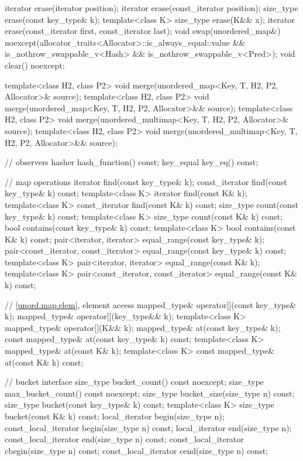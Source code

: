 \begin{codeblock}
{{    iterator  erase(iterator position);
    iterator  erase(const_iterator position);
    size_type erase(const key_type& k);
    template<class K> size_type erase(K&& x);
    iterator  erase(const_iterator first, const_iterator last);
    void      swap(unordered_map&)
      noexcept(allocator_traits<Allocator>::is_always_equal::value &&
               is_nothrow_swappable_v<Hash> &&
               is_nothrow_swappable_v<Pred>);
    void      clear() noexcept;

    template<class H2, class P2>
      void merge(unordered_map<Key, T, H2, P2, Allocator>& source);
    template<class H2, class P2>
      void merge(unordered_map<Key, T, H2, P2, Allocator>&& source);
    template<class H2, class P2>
      void merge(unordered_multimap<Key, T, H2, P2, Allocator>& source);
    template<class H2, class P2>
      void merge(unordered_multimap<Key, T, H2, P2, Allocator>&& source);

    // observers
    hasher hash_function() const;
    key_equal key_eq() const;

    // map operations
    iterator         find(const key_type& k);
    const_iterator   find(const key_type& k) const;
    template<class K>
      iterator       find(const K& k);
    template<class K>
      const_iterator find(const K& k) const;
    size_type        count(const key_type& k) const;
    template<class K>
      size_type      count(const K& k) const;
    bool             contains(const key_type& k) const;
    template<class K>
      bool           contains(const K& k) const;
    pair<iterator, iterator>               equal_range(const key_type& k);
    pair<const_iterator, const_iterator>   equal_range(const key_type& k) const;
    template<class K>
      pair<iterator, iterator>             equal_range(const K& k);
    template<class K>
      pair<const_iterator, const_iterator> equal_range(const K& k) const;

    // \ref{unord.map.elem}, element access
    mapped_type& operator[](const key_type& k);
    mapped_type& operator[](key_type&& k);
    template<class K> mapped_type& operator[](K&& k);
    mapped_type& at(const key_type& k);
    const mapped_type& at(const key_type& k) const;
    template<class K> mapped_type& at(const K& k);
    template<class K> const mapped_type& at(const K& k) const;

    // bucket interface
    size_type bucket_count() const noexcept;
    size_type max_bucket_count() const noexcept;
    size_type bucket_size(size_type n) const;
    size_type bucket(const key_type& k) const;
    template<class K> size_type bucket(const K& k) const;
    local_iterator begin(size_type n);
    const_local_iterator begin(size_type n) const;
    local_iterator end(size_type n);
    const_local_iterator end(size_type n) const;
    const_local_iterator cbegin(size_type n) const;
    const_local_iterator cend(size_type n) const;

}}
\end{codeblock}
